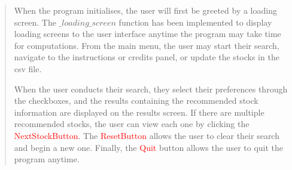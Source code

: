 \documentclass[fontsize=12pt]{article}
\begin{document}
\begin{quote}
When the program initialises, the user will first be greeted by a loading screen. The \texttt{$\_loading\_screen$} function has been implemented to display loading screens to the user interface anytime the program may take time for computations. From the main menu, the user may start their search, navigate to the instructions or credits panel, or update the stocks in the csv file.

When the user conducts their search, they select their preferences through the checkboxes, and the results containing the recommended stock information are displayed on the results screen. If there are multiple recommended stocks, the user can view each one by clicking the \textcolor{red}{NextStockButton}. The \textcolor{red}{ResetButton} allows the user to clear their search and begin a new one. Finally, the \textcolor{red}{Quit} button allows the user to quit the program anytime.
\end{quote}
\end{document}
